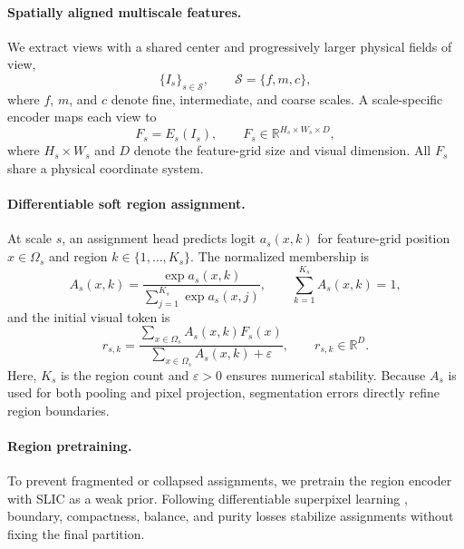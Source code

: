 \documentclass[letterpaper]{article}
\begin{document}
\paragraph{Spatially aligned multiscale features.}
We extract views with a shared center and progressively larger physical fields of view,
\begin{equation}
\{I_s\}_{s\in\mathcal{S}},\qquad \mathcal{S}=\{f,m,c\},
\label{eq:scales}
\end{equation}
where $f$, $m$, and $c$ denote fine, intermediate, and coarse scales. A scale-specific encoder maps each view to
\begin{equation}
F_s=E_s(I_s),\qquad F_s\in\mathbb{R}^{H_s\times W_s\times D},
\label{eq:features}
\end{equation}
where $H_s\times W_s$ and $D$ denote the feature-grid size and visual dimension. All $F_s$ share a physical coordinate system.

\paragraph{Differentiable soft region assignment.}
At scale $s$, an assignment head predicts logit $a_s(x,k)$ for feature-grid position $x\in\Omega_s$ and region $k\in\{1,\ldots,K_s\}$. The normalized membership is
\begin{equation}
A_s(x,k)=\frac{\exp a_s(x,k)}{\sum_{j=1}^{K_s}\exp a_s(x,j)},
\qquad \sum_{k=1}^{K_s}A_s(x,k)=1,
\label{eq:assignment}
\end{equation}
and the initial visual token is
\begin{equation}
r_{s,k}=
\frac{\sum_{x\in\Omega_s}A_s(x,k)F_s(x)}
{\sum_{x\in\Omega_s}A_s(x,k)+\varepsilon},
\qquad r_{s,k}\in\mathbb{R}^{D}.
\label{eq:pool}
\end{equation}
Here, $K_s$ is the region count and $\varepsilon>0$ ensures numerical stability. Because $A_s$ is used for both pooling and pixel projection, segmentation errors directly refine region boundaries.

\paragraph{Region pretraining.}
To prevent fragmented or collapsed assignments, we pretrain the region encoder with SLIC \cite{achanta2012slic} as a weak prior. Following differentiable superpixel learning \cite{jampani2018ssn}, boundary, compactness, balance, and purity losses stabilize assignments without fixing the final partition.
\end{document}
